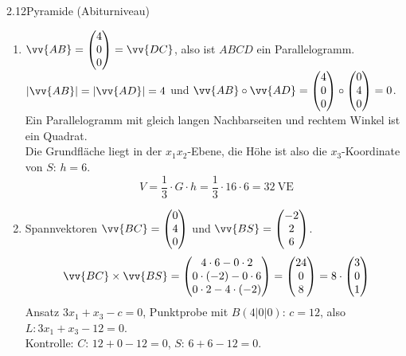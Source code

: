 \begin{loesung}{2.12}{Pyramide (Abiturniveau)}
\begin{enumerate}[label=\alph*)]
  \item $\vv{AB} = \begin{pmatrix} 4\\ 0\\ 0\end{pmatrix} = \vv{DC}$, also ist $ABCD$ ein Parallelogramm.\\
  $|\vv{AB}| = |\vv{AD}| = 4$ und $\vv{AB}\circ\vv{AD} = \begin{pmatrix} 4\\ 0\\ 0\end{pmatrix}\circ\begin{pmatrix} 0\\ 4\\ 0\end{pmatrix} = 0$. Ein Parallelogramm mit gleich langen Nachbarseiten und rechtem Winkel ist ein Quadrat.\\
  Die Grundfläche liegt in der $x_1x_2$-Ebene, die Höhe ist also die $x_3$-Koordinate von $S$: $h=6$.
  \[V = \dfrac{1}{3}\cdot G\cdot h = \dfrac{1}{3}\cdot 16\cdot 6 = 32\ \text{VE}\]
  \item Spannvektoren $\vv{BC} = \begin{pmatrix} 0\\ 4\\ 0\end{pmatrix}$ und $\vv{BS} = \begin{pmatrix} -2\\ 2\\ 6\end{pmatrix}$.
  \[\vv{BC}\times\vv{BS} = \begin{pmatrix} 4\cdot 6-0\cdot 2\\ 0\cdot(-2)-0\cdot 6\\ 0\cdot 2-4\cdot(-2)\end{pmatrix} = \begin{pmatrix} 24\\ 0\\ 8\end{pmatrix} = 8\cdot\begin{pmatrix} 3\\ 0\\ 1\end{pmatrix}\]
  Ansatz $3x_1+x_3-c=0$, Punktprobe mit $B(4|0|0)$: $c=12$, also $L: 3x_1+x_3-12=0$.\\
  Kontrolle: $C$: $12+0-12=0$, $S$: $6+6-12=0$.

\end{enumerate}
\end{loesung}
